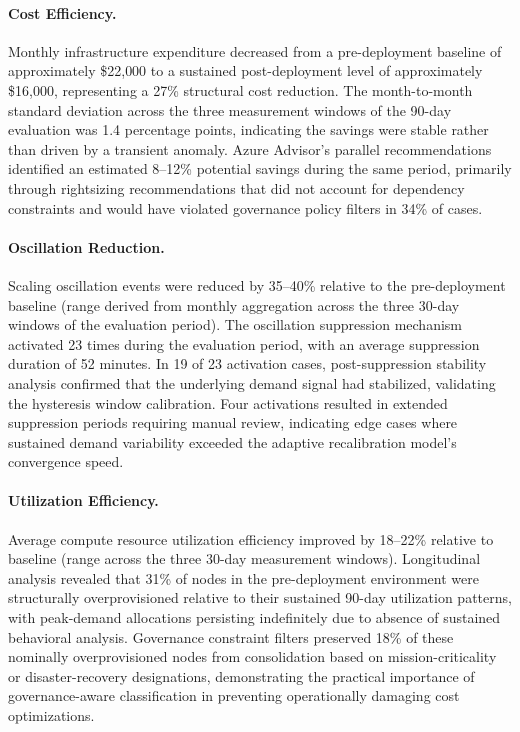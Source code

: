 \documentclass[runningheads]{llncs}
\begin{document}
\paragraph{Cost Efficiency.} Monthly infrastructure expenditure decreased from a pre-deployment baseline of approximately \$22{,}000 to a sustained post-deployment level of approximately \$16{,}000, representing a 27\% structural cost reduction. The month-to-month standard deviation across the three measurement windows of the 90-day evaluation was 1.4 percentage points, indicating the savings were stable rather than driven by a transient anomaly. Azure Advisor's parallel recommendations identified an estimated 8--12\% potential savings during the same period, primarily through rightsizing recommendations that did not account for dependency constraints and would have violated governance policy filters in 34\% of cases.

\paragraph{Oscillation Reduction.} Scaling oscillation events were reduced by 35--40\% relative to the pre-deployment baseline (range derived from monthly aggregation across the three 30-day windows of the evaluation period). The oscillation suppression mechanism activated 23 times during the evaluation period, with an average suppression duration of 52 minutes. In 19 of 23 activation cases, post-suppression stability analysis confirmed that the underlying demand signal had stabilized, validating the hysteresis window calibration. Four activations resulted in extended suppression periods requiring manual review, indicating edge cases where sustained demand variability exceeded the adaptive recalibration model's convergence speed.

\paragraph{Utilization Efficiency.} Average compute resource utilization efficiency improved by 18--22\% relative to baseline (range across the three 30-day measurement windows). Longitudinal analysis revealed that 31\% of nodes in the pre-deployment environment were structurally overprovisioned relative to their sustained 90-day utilization patterns, with peak-demand allocations persisting indefinitely due to absence of sustained behavioral analysis. Governance constraint filters preserved 18\% of these nominally overprovisioned nodes from consolidation based on mission-criticality or disaster-recovery designations, demonstrating the practical importance of governance-aware classification in preventing operationally damaging cost optimizations.
\end{document}
